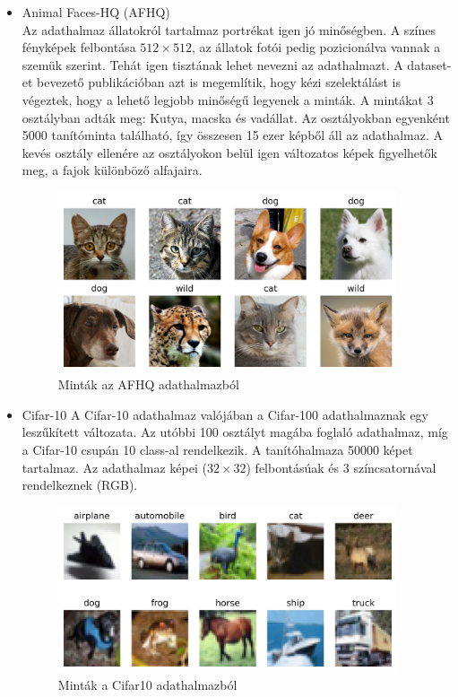 \begin{itemize}
	\item Animal Faces-HQ (AFHQ) \cite{choi2020stargan}\\
		Az adathalmaz állatokról tartalmaz portrékat igen jó minőségben. A színes fényképek felbontása $ 512 \times 512 $, az állatok fotói pedig pozicionálva vannak a szemük szerint. Tehát igen tisztának lehet nevezni az adathalmazt. A dataset-et bevezető publikációban azt is megemlítik, hogy kézi szelektálást is végeztek, hogy a lehető legjobb minőségű legyenek a minták. A mintákat 3 osztályban adták meg: Kutya, macska és vadállat. Az osztályokban egyenként 5000 tanítóminta található, így összesen 15 ezer képből áll az adathalmaz. A kevés osztály ellenére az osztályokon belül igen változatos képek figyelhetők meg, a fajok különböző alfajaira.
		
		\begin{figure}[h]
			\centering
			\includegraphics[width=10cm]{images/afhq_dataset_samples.png}
			\caption{Minták az AFHQ adathalmazból}
			\label{fig:afhq_dataset_samples}
		\end{figure}
	
	\item Cifar-10 \cite{krizhevsky2009learning}
		A Cifar-10 adathalmaz valójában a Cifar-100 adathalmaznak egy leszűkített változata. Az utóbbi 100 osztályt magába foglaló adathalmaz, míg a Cifar-10 csupán 10 class-al rendelkezik. A tanítóhalmaza 50000 képet tartalmaz.
		Az adathalmaz képei ($32 \times 32$) felbontásúak és 3 színcsatornával rendelkeznek (RGB).
		
		\begin{figure}[h]
			\centering
			\includegraphics[width=10cm]{images/cifar10_dataset_samples.png}
			\caption{Minták a Cifar10 adathalmazból}
			\label{fig:cifar10_dataset_samples}
		\end{figure}
\end{itemize}


